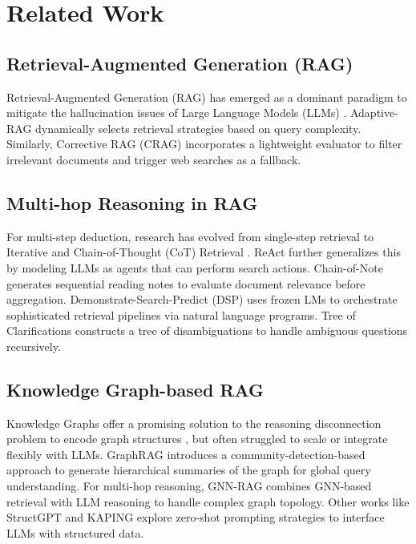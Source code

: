 \documentclass[11pt]{article}
\begin{document}
\section{Related Work}
\subsection{Retrieval-Augmented Generation (RAG)}
Retrieval-Augmented Generation (RAG) has emerged as a dominant paradigm to mitigate the hallucination issues of Large Language Models (LLMs) \citep{lewis2020retrieval, guu2020realm, karpukhin2020dense, izacard2021unsupervised, asai2023selfrag}. Adaptive-RAG \citep{jeong2024adaptiverag} dynamically selects retrieval strategies based on query complexity. Similarly, Corrective RAG (CRAG) \citep{yan2024corrective} incorporates a lightweight evaluator to filter irrelevant documents and trigger web searches as a fallback. 
\subsection{Multi-hop Reasoning in RAG}
For multi-step deduction, research has evolved from single-step retrieval to Iterative and Chain-of-Thought (CoT) Retrieval \citep{trivedi2022interleaving}. ReAct \citep{yao2022react} further generalizes this by modeling LLMs as agents that can perform search actions. Chain-of-Note \citep{yu2023chainofnote} generates sequential reading notes to evaluate document relevance before aggregation. Demonstrate-Search-Predict (DSP) \citep{khattab2022demonstrate} uses frozen LMs to orchestrate sophisticated retrieval pipelines via natural language programs. Tree of Clarifications \citep{kim2023tree} constructs a tree of disambiguations to handle ambiguous questions recursively. 
\subsection{Knowledge Graph-based RAG}
Knowledge Graphs offer a promising solution to the reasoning disconnection problem to encode graph structures \citep{yasunaga2021qa, zhang2022greaselm}, but often struggled to scale or integrate flexibly with LLMs. GraphRAG \citep{edge2024graphrag} introduces a community-detection-based approach to generate hierarchical summaries of the graph for global query understanding. For multi-hop reasoning, GNN-RAG \citep{mavromatis-karypis-2025-gnn} combines GNN-based retrieval with LLM reasoning to handle complex graph topology. Other works like StructGPT \citep{jiang2023structgpt} and KAPING \citep{baek-etal-2023-knowledge} explore zero-shot prompting strategies to interface LLMs with structured data. 
\end{document}
